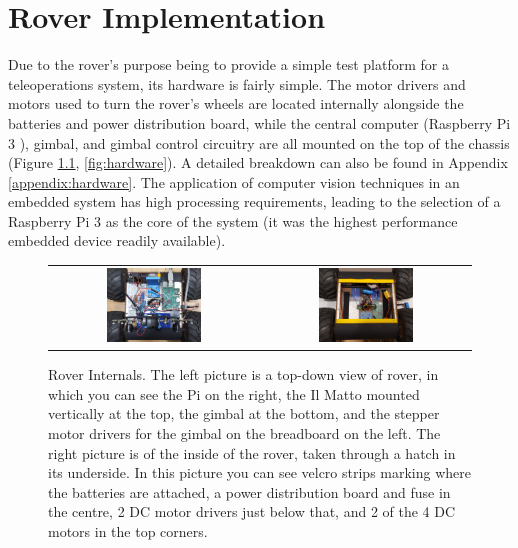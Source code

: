 \chapter{Rover Implementation}
\label{chapter:rover}

Due to the rover's purpose being to provide a simple test platform for a teleoperations system, its hardware is fairly simple. The motor drivers and motors used to turn the rover's wheels are located internally alongside the batteries and power distribution board, while the central computer (Raspberry Pi 3 \cite{pi}), gimbal, and gimbal control circuitry are all mounted on the top of the chassis (Figure \ref{fig:internals}, \ref{fig:hardware}). A detailed breakdown can also be found in Appendix \ref{appendix:hardware}. The application of computer vision techniques in an embedded system has high processing requirements, leading to the selection of a Raspberry Pi 3 as the core of the system (it was the highest performance embedded device readily available). 

\begin{figure}[H]
    \begin{center}
    \begin{tabular}{ c c }
        \includegraphics[width=0.47\textwidth]{Figures/rovertop.jpg} &
        \includegraphics[width=0.47\textwidth]{Figures/roverinside.jpg}
    \end{tabular}
    \caption[Rover Internals]{Rover Internals. The left picture is a top-down view of rover, in which you can see the Pi on the right, the Il Matto mounted vertically at the top, the gimbal at the bottom, and the stepper motor drivers for the gimbal on the breadboard on the left. The right picture is of the inside of the rover, taken through a hatch in its underside. In this picture you can see velcro strips marking where the batteries are attached, a power distribution board and fuse in the centre, 2 DC motor drivers just below that, and 2 of the 4 DC motors in the top corners.}
    \label{fig:internals}
    \end{center}
\end{figure}

